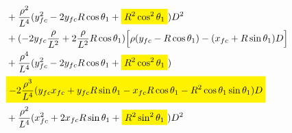\documentclass[12pt]{article}
\newcommand{\mathcolorbox}[2]{\colorbox{#1}{$\displaystyle #2$}}
\begin{document}
\begin{align}
    &+ \frac{\rho^2}{L^4}(y_{fc}^2 -2y_{fc}R\cos\theta_1 +  \mathcolorbox{yellow}{ R^2\cos^2\theta_1 } )D^2 \nonumber\\
    &+ (-2y_{fc}\frac{\rho}{L^2} +2\frac{\rho}{L^2}R\cos\theta_1)\Bigl[\rho(y_{fc}-R\cos\theta_1) - (x_{fc} + R\sin\theta_1)D\Bigr] \nonumber\\
    &+   \frac{\rho^4}{L^4}(y_{fc}^2 -2y_{fc}R\cos\theta_1 +  \mathcolorbox{yellow}{  R^2\cos^2\theta_1  } ) \nonumber\\
    &\mathcolorbox{yellow}{  - 2\frac{\rho^3}{L^4}(y_{fc}x_{fc} + y_{fc}R\sin\theta_1 -x_{fc}R\cos\theta_1 -R^2\cos\theta_1\sin\theta_1)D  } \nonumber\\
    &+\frac{\rho^2}{L^4}(x_{fc}^2 + 2x_{fc}R\sin\theta_1 + \mathcolorbox{yellow}{ R^2\sin^2\theta_1 } )D^2
\end{align}
\end{document}
